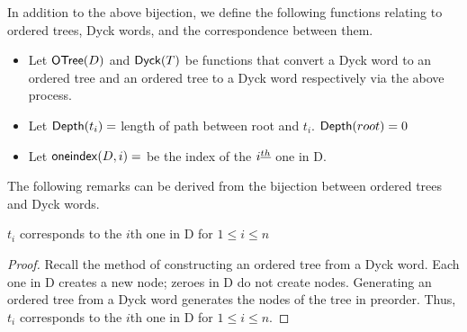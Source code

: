 In addition to the above bijection, we define the following functions relating to ordered trees, Dyck words, and the correspondence between them.

\begin{itemize}
    \item Let $\mathsf{OTree}{(D)}$ and $\mathsf{Dyck}{(T)}$ be functions that convert a Dyck word to an ordered tree and an ordered tree to a Dyck word respectively via the above process.
    \item Let $\mathsf{Depth}{(t_i)}=$ length of path between root and $t_i$. $\mathsf{Depth}{(root)}=0$
    \item Let $\mathsf{oneindex}({D}, i)=$ be the index of the $i^{\underline{th}}{}$ one in D.
\end{itemize}

\bigskip


The following remarks can be derived from the bijection between ordered trees and Dyck words. 


\begin{remark}
    $t_i$ corresponds to the $i$th one in D for $1 \le i \le n$
\end{remark}
\begin{proof}
    Recall the method of constructing an ordered tree from a Dyck word.  Each one in D creates a new node; zeroes in D do not create nodes.  Generating an ordered tree from a Dyck word generates the nodes of the tree in preorder.  Thus, $t_i$ corresponds to the $i$th one in D for $1 \le i \le n$.
\end{proof}

